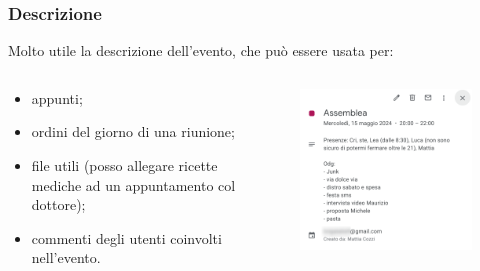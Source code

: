 \documentclass[handout]{beamer}
\begin{document}
\begin{frame}
\frametitle{Descrizione}
Molto utile la descrizione dell'evento, che può essere usata per:
\begin{columns}
  \begin{column}{.5\textwidth}
\begin{itemize}
  \item appunti;
  \item ordini del giorno di una riunione;
  \item file utili (posso allegare ricette mediche ad un appuntamento col dottore);
  \item commenti degli utenti coinvolti nell'evento.
\end{itemize}
  \end{column}
  \begin{column}{.4\textwidth}
    \begin{figure}
      \includegraphics[width=\columnwidth]{img/calendarnotes.png}
    \end{figure}
  \end{column}
\end{columns}

\end{frame}
\end{document}
